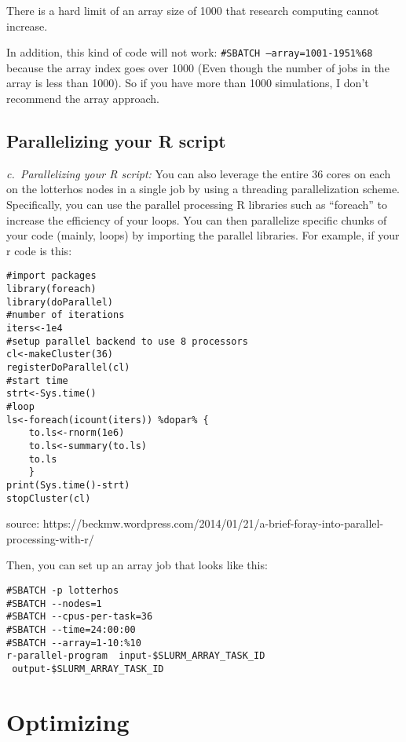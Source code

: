\documentclass[
  letterpaper,
  DIV=11,
  numbers=noendperiod]{scrreprt}
\begin{document}
There is a hard limit of an array size of 1000 that research computing
cannot increase.

In addition, this kind of code will not work:
\texttt{\#SBATCH\ —array=1001-1951\%68} because the array index goes
over 1000 (Even though the number of jobs in the array is less than
1000). So if you have more than 1000 simulations, I don't recommend the
array approach.

\hypertarget{parallelizing-your-r-script}{%
\section*{\texorpdfstring{\textbf{Parallelizing your R
script}}{Parallelizing your R script}}\label{parallelizing-your-r-script}}

\emph{c.~Parallelizing your R script:} You can also leverage the entire
36 cores on each on the lotterhos nodes in a single job by using a
threading parallelization scheme. Specifically, you can use the parallel
processing R libraries such as ``foreach'' to increase the efficiency of
your loops. You can then parallelize specific chunks of your code
(mainly, loops) by importing the parallel libraries. For example, if
your r code is this:

\begin{verbatim}
#import packages
library(foreach)
library(doParallel)
#number of iterations
iters<-1e4
#setup parallel backend to use 8 processors
cl<-makeCluster(36)
registerDoParallel(cl)
#start time
strt<-Sys.time()
#loop
ls<-foreach(icount(iters)) %dopar% {
    to.ls<-rnorm(1e6)
    to.ls<-summary(to.ls)
    to.ls
    }
print(Sys.time()-strt)
stopCluster(cl)
\end{verbatim}

source:
https://beckmw.wordpress.com/2014/01/21/a-brief-foray-into-parallel-processing-with-r/

Then, you can set up an array job that looks like this:

\begin{verbatim}
#SBATCH -p lotterhos
#SBATCH --nodes=1
#SBATCH --cpus-per-task=36
#SBATCH --time=24:00:00
#SBATCH --array=1-10:%10
r-parallel-program  input-$SLURM_ARRAY_TASK_ID  output-$SLURM_ARRAY_TASK_ID
\end{verbatim}

\hypertarget{optimizing}{%
\chapter{Optimizing}\label{optimizing}}
\end{document}
